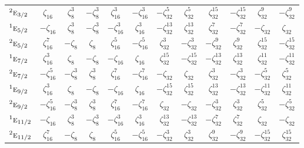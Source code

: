 \documentclass[10pt,a4paper]{article}
\numberwithin{equation}{section}
\newcommand{\irr}[1]{\text{\normalfont\scshape #1}}
\newcommand{\conjpair}[1]{{}^{#1}}
\newcommand{\rootunity}[1]{\zeta_{#1}}
\begin{document}
{\begin{longtable}{@{}lccccccccccc@{}}
$\conjpair{2}\irr{e}_{3/2}$ & $\rootunity{16}$ & $\rootunity{8}^{3}$ & $-\rootunity{8}^{3}$ & $\rootunity{16}^{3}$ & $-\rootunity{16}^{3}$ & $-\rootunity{32}^{5}$ & $\rootunity{32}^{5}$ & $\rootunity{32}^{15}$ & $-\rootunity{32}^{15}$ & $\rootunity{32}^{9}$ & $-\rootunity{32}^{9}$\\
$\conjpair{1}\irr{e}_{5/2}$ & $-\rootunity{16}$ & $\rootunity{8}^{3}$ & $-\rootunity{8}^{3}$ & $-\rootunity{16}^{3}$ & $\rootunity{16}^{3}$ & $-\rootunity{32}^{13}$ & $\rootunity{32}^{13}$ & $\rootunity{32}^{7}$ & $-\rootunity{32}^{7}$ & $-\rootunity{32}$ & $\rootunity{32}$\\
$\conjpair{2}\irr{e}_{5/2}$ & $\rootunity{16}^{7}$ & $-\rootunity{8}$ & $\rootunity{8}$ & $\rootunity{16}^{5}$ & $-\rootunity{16}^{5}$ & $\rootunity{32}^{3}$ & $-\rootunity{32}^{3}$ & $-\rootunity{32}^{9}$ & $\rootunity{32}^{9}$ & $\rootunity{32}^{15}$ & $-\rootunity{32}^{15}$\\
$\conjpair{1}\irr{e}_{7/2}$ & $\rootunity{16}^{3}$ & $\rootunity{8}$ & $-\rootunity{8}$ & $-\rootunity{16}$ & $\rootunity{16}$ & $\rootunity{32}^{15}$ & $-\rootunity{32}^{15}$ & $-\rootunity{32}^{13}$ & $\rootunity{32}^{13}$ & $\rootunity{32}^{11}$ & $-\rootunity{32}^{11}$\\
$\conjpair{2}\irr{e}_{7/2}$ & $-\rootunity{16}^{5}$ & $-\rootunity{8}^{3}$ & $\rootunity{8}^{3}$ & $\rootunity{16}^{7}$ & $-\rootunity{16}^{7}$ & $-\rootunity{32}$ & $\rootunity{32}$ & $\rootunity{32}^{3}$ & $-\rootunity{32}^{3}$ & $-\rootunity{32}^{5}$ & $\rootunity{32}^{5}$\\
$\conjpair{1}\irr{e}_{9/2}$ & $\rootunity{16}^{3}$ & $\rootunity{8}$ & $-\rootunity{8}$ & $-\rootunity{16}$ & $\rootunity{16}$ & $-\rootunity{32}^{15}$ & $\rootunity{32}^{15}$ & $\rootunity{32}^{13}$ & $-\rootunity{32}^{13}$ & $-\rootunity{32}^{11}$ & $\rootunity{32}^{11}$\\
$\conjpair{2}\irr{e}_{9/2}$ & $-\rootunity{16}^{5}$ & $-\rootunity{8}^{3}$ & $\rootunity{8}^{3}$ & $\rootunity{16}^{7}$ & $-\rootunity{16}^{7}$ & $\rootunity{32}$ & $-\rootunity{32}$ & $-\rootunity{32}^{3}$ & $\rootunity{32}^{3}$ & $\rootunity{32}^{5}$ & $-\rootunity{32}^{5}$\\
$\conjpair{1}\irr{e}_{11/2}$ & $-\rootunity{16}$ & $\rootunity{8}^{3}$ & $-\rootunity{8}^{3}$ & $-\rootunity{16}^{3}$ & $\rootunity{16}^{3}$ & $\rootunity{32}^{13}$ & $-\rootunity{32}^{13}$ & $-\rootunity{32}^{7}$ & $\rootunity{32}^{7}$ & $\rootunity{32}$ & $-\rootunity{32}$\\
$\conjpair{2}\irr{e}_{11/2}$ & $\rootunity{16}^{7}$ & $-\rootunity{8}$ & $\rootunity{8}$ & $\rootunity{16}^{5}$ & $-\rootunity{16}^{5}$ & $-\rootunity{32}^{3}$ & $\rootunity{32}^{3}$ & $\rootunity{32}^{9}$ & $-\rootunity{32}^{9}$ & $-\rootunity{32}^{15}$ & $\rootunity{32}^{15}$\\

\end{longtable}}
\end{document}
